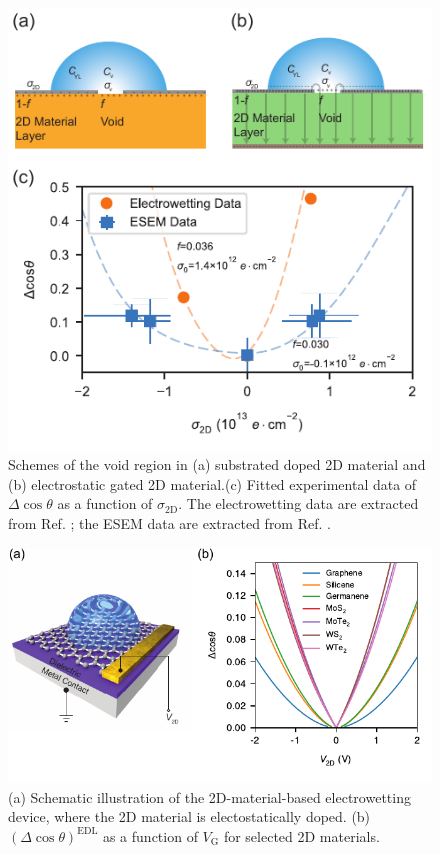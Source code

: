 \documentclass[journal=jacsat,manuscript=article,email=true]{achemso}
\begin{document}
\begin{figure}[htbp]
\centering
\includegraphics[width=0.95\linewidth]{../img/plot-fitting.pdf}
\caption{\label{fig:f-nc-exp}
Schemes of the void region in (a) substrated doped 2D material and (b) electrostatic gated 2D material.(c) Fitted experimental data of \(\Delta\cos\theta\) as a function of \(\sigma_{\mathrm{2D}}\). The electrowetting data are extracted from Ref. ; the ESEM data are extracted from Ref. .}
\end{figure}


\begin{figure}[htbp]
\centering
\includegraphics[width=0.65\linewidth]{../img/dcos-all-2D.pdf}
\caption{\label{fig:dcos-all-2D}
(a) Schematic illustration of the 2D-material-based electrowetting device, where the 2D material is electostatically doped. (b) \((\Delta\cos\theta)^{\mathrm{EDL}}\) as a function of \(V_{\mathrm{G}}\) for selected 2D materials.}
\end{figure}
\end{document}
